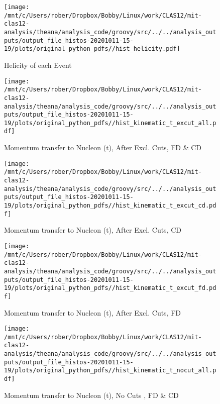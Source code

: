 \documentclass{article}
\begin{document}
\begin{landscape}
    \begin{figure}[h]
        \centering

        \texttt{[image: /mnt/c/Users/rober/Dropbox/Bobby/Linux/work/CLAS12/mit-clas12-analysis/theana/analysis\_code/groovy/src/../../analysis\_outputs/output\_file\_histos-20201011-15-19/plots/original\_python\_pdfs//hist\_helicity.pdf]}
        \captionsetup{textformat=empty,labelformat=blank}
        \caption{Helicity of each Event}
    \end{figure}
    \clearpage
    
    \begin{figure}[h]
        \centering

        \texttt{[image: /mnt/c/Users/rober/Dropbox/Bobby/Linux/work/CLAS12/mit-clas12-analysis/theana/analysis\_code/groovy/src/../../analysis\_outputs/output\_file\_histos-20201011-15-19/plots/original\_python\_pdfs//hist\_kinematic\_t\_excut\_all.pdf]}
        \captionsetup{textformat=empty,labelformat=blank}
        \caption{Momentum transfer to Nucleon (t), After Excl. Cuts, FD \& CD}
    \end{figure}
    \clearpage
    
    \begin{figure}[h]
        \centering

        \texttt{[image: /mnt/c/Users/rober/Dropbox/Bobby/Linux/work/CLAS12/mit-clas12-analysis/theana/analysis\_code/groovy/src/../../analysis\_outputs/output\_file\_histos-20201011-15-19/plots/original\_python\_pdfs//hist\_kinematic\_t\_excut\_cd.pdf]}
        \captionsetup{textformat=empty,labelformat=blank}
        \caption{Momentum transfer to Nucleon (t), After Excl. Cuts, CD}
    \end{figure}
    \clearpage
    
    \begin{figure}[h]
        \centering

        \texttt{[image: /mnt/c/Users/rober/Dropbox/Bobby/Linux/work/CLAS12/mit-clas12-analysis/theana/analysis\_code/groovy/src/../../analysis\_outputs/output\_file\_histos-20201011-15-19/plots/original\_python\_pdfs//hist\_kinematic\_t\_excut\_fd.pdf]}
        \captionsetup{textformat=empty,labelformat=blank}
        \caption{Momentum transfer to Nucleon (t), After Excl. Cuts, FD}
    \end{figure}
    \clearpage
    
    \begin{figure}[h]
        \centering

        \texttt{[image: /mnt/c/Users/rober/Dropbox/Bobby/Linux/work/CLAS12/mit-clas12-analysis/theana/analysis\_code/groovy/src/../../analysis\_outputs/output\_file\_histos-20201011-15-19/plots/original\_python\_pdfs//hist\_kinematic\_t\_nocut\_all.pdf]}
        \captionsetup{textformat=empty,labelformat=blank}
        \caption{Momentum transfer to Nucleon (t), No Cuts , FD \& CD}
    \end{figure}
    \clearpage
    

\end{landscape}
\end{document}
